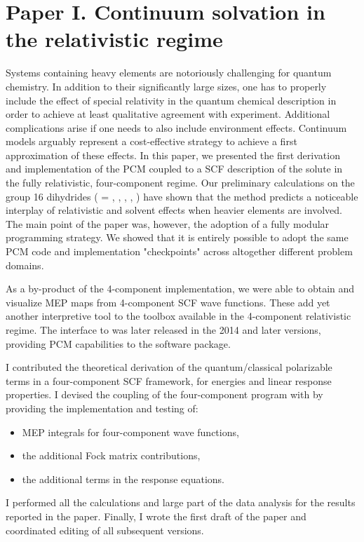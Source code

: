 \section*{Paper I. Continuum solvation in the relativistic regime}

Systems containing heavy elements are notoriously challenging for quantum chemistry.
In addition to their significantly large sizes, one has to properly include the
effect of special relativity in the quantum chemical description in order to
achieve at least qualitative agreement with experiment.
Additional complications arise if one needs to also include environment effects.
Continuum models arguably represent a cost-effective strategy to achieve a first
approximation of these effects.
In this paper, we presented the first derivation and implementation of the \acs{PCM}
coupled to a \acs{SCF} description of the solute in the fully relativistic, four-component
regime.
Our preliminary calculations on the group 16 dihydrides  ( =
, , , , ) have shown that the method predicts
a noticeable interplay of relativistic and solvent effects when heavier
elements are involved.
The main point of the paper was, however, the adoption of a fully modular
programming strategy. We showed that it is entirely possible to adopt the same
\acs{PCM} code and implementation "checkpoints" across altogether different
problem domains.

As a by-product of the 4-component implementation, we were able to obtain and visualize \acs{MEP} maps
from 4-component \acs{SCF} wave functions. These add yet another interpretive tool to the toolbox available
in the 4-component relativistic regime.
The interface to \DIRAC was later released in the 2014 and later versions,
providing \acs{PCM} capabilities to the software package.

I contributed the theoretical derivation of the quantum/classical polarizable
terms in a four-component \acs{SCF} framework, for energies and linear response
properties. I devised the coupling of the four-component program \DIRAC with
\pcmsolver by providing the implementation and testing of:
\begin{itemize}
  \item \acs{MEP} integrals for four-component wave functions,
  \item the additional Fock matrix contributions,
  \item the additional terms in the response equations.
\end{itemize}
I performed all the calculations and large part of the data analysis
for the results reported in the paper.
Finally, I wrote the first draft of the paper and coordinated editing of
all subsequent versions.

